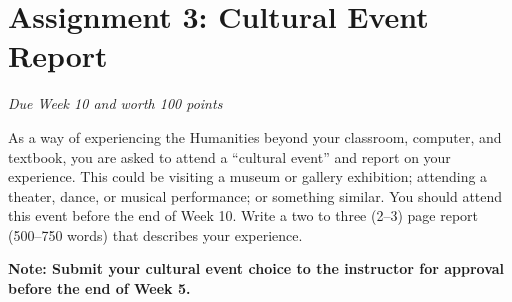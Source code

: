 \pagebreak
\section*{Assignment 3: Cultural Event Report}
\emph{Due Week 10 and worth 100 points}

As a way of experiencing the Humanities beyond your classroom, computer, and textbook, you are asked to attend a ``cultural event'' and report on your experience. This could be visiting a museum or gallery exhibition; attending a theater, dance, or musical performance; or something similar. You should attend this event before the end of Week 10. Write a two to three (2--3) page report (500--750 words) that describes your experience.

\textbf{Note: Submit your cultural event choice to the instructor for approval before the end of Week 5.}

